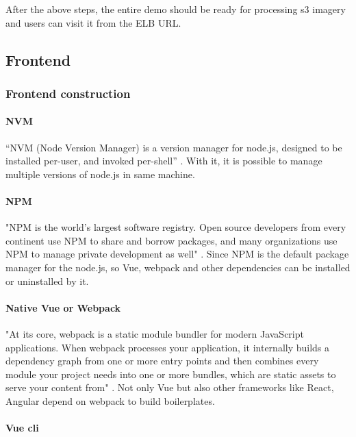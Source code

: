 \documentclass[conference]{IEEEtran}
\begin{document}
After the above steps, the entire demo should be ready for processing s3 imagery and users can visit it from the ELB URL.

\subsection{Frontend}

\subsubsection{Frontend construction}
 
\paragraph{NVM}
    
“NVM (Node Version Manager) is a version manager for node.js, designed to be installed per-user, and invoked per-shell” 
\cite{nvmshnvm87:online}. With it, it is possible to manage multiple versions of node.js in same machine.

\paragraph{NPM}

"NPM is the world's largest software registry. Open source developers from every continent use NPM to share and borrow packages, 
and many organizations use NPM to manage private development as well" \cite{Aboutnpm31:online}. Since NPM is the default package manager for the 
node.js, so Vue, webpack and other dependencies can be installed or uninstalled by it.

\paragraph{Native Vue or Webpack}

"At its core, webpack is a static module bundler for modern JavaScript applications. When webpack processes your application, it 
internally builds a dependency graph from one or more entry points and then combines every module your project needs into one or 
more bundles, which are static assets to serve your content from" \cite{Concepts28:online}. Not only Vue but also other frameworks like React, 
Angular depend on webpack to build boilerplates.

\paragraph{Vue cli}
\end{document}
